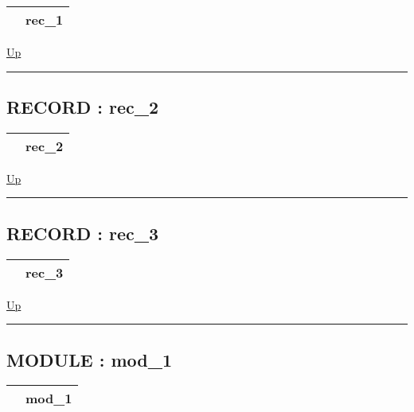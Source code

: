 {\renewcommand{\arraystretch}{1.5}
\begin{tabularx}{\textwidth}{|>{\raggedright\arraybackslash}l|X|}
\hline
\hspace{0pt} & rec\_1 \\
\hline
\end{tabularx}
}

\hyperlink{ecldoc:intest.inintest.example_2}{Up}

\par


\rule{\textwidth}{0.4pt}
\subsection*{RECORD : rec\_2}
\hypertarget{ecldoc:intest.inintest.example_2.rec_2}{}

{\renewcommand{\arraystretch}{1.5}
\begin{tabularx}{\textwidth}{|>{\raggedright\arraybackslash}l|X|}
\hline
\hspace{0pt} & rec\_2 \\
\hline
\end{tabularx}
}

\hyperlink{ecldoc:intest.inintest.example_2}{Up}

\par


\rule{\textwidth}{0.4pt}
\subsection*{RECORD : rec\_3}
\hypertarget{ecldoc:intest.inintest.example_2.rec_3}{}

{\renewcommand{\arraystretch}{1.5}
\begin{tabularx}{\textwidth}{|>{\raggedright\arraybackslash}l|X|}
\hline
\hspace{0pt} & rec\_3 \\
\hline
\end{tabularx}
}

\hyperlink{ecldoc:intest.inintest.example_2}{Up}

\par


\rule{\textwidth}{0.4pt}
\subsection*{MODULE : mod\_1}
\hypertarget{ecldoc:intest.inintest.example_2.mod_1}{}

{\renewcommand{\arraystretch}{1.5}
\begin{tabularx}{\textwidth}{|>{\raggedright\arraybackslash}l|X|}
\hline
\hspace{0pt} & mod\_1 \\
\hline
\end{tabularx}
}

